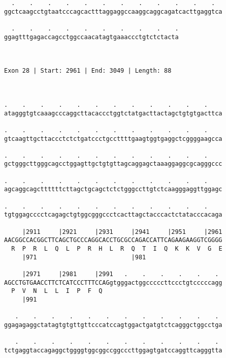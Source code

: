 \documentclass{article}
\begin{document}
\begin{Verbatim}
  .    .    .    .    .    .    .    .    .    .    .    .  
ggctcaagcctgtaatcccagcactttaggaggccaaggcaggcagatcacttgaggtca
                                                            
  .    .    .    .    .    .    .    .    .    .
ggagtttgagaccagcctggccaacatagtgaaaccctgtctctacta
                                                
                                                
 
Exon 28 | Start: 2961 | End: 3049 | Length: 88



.    .    .    .    .    .    .    .    .    .    .    .    
atagggtgtcaaagcccaggcttacaccctggtctatgacttactagctgtgtgacttca
                                                            
.    .    .    .    .    .    .    .    .    .    .    .    
gtcaagttgcttaccctctctgatccctgccttttgaagtggtgaggctcggggaagcca
                                                            
.    .    .    .    .    .    .    .    .    .    .    .    
gctgggcttgggcagcctggagttgctgtgttagcaggagctaaaggaggcgcagggccc
                                                            
.    .    .    .    .    .    .    .    .    .    .    .    
agcaggcagcttttttcttagctgcagctctctgggccttgtctcaagggaggttggagc
                                                            
.    .    .    .    .    .    .    .    .    .    .    .    
tgtggagcccctcagagctgtggcgggccctcacttagctacccactctatacccacaga
                                                            
     |2911     |2921     |2931     |2941     |2951     |2961
AACGGCCACGGCTTCAGCTGCCCAGGCACCTGCGCCAGACCATTCAGAAGAAGGTCGGGG
  R  P  R  L  Q  L  P  R  H  L  R  Q  T  I  Q  K  K  V  G  E
     |971                          |981                     
  
     |2971     |2981     |2991   .    .    .    .    .    . 
AGCCTGTGAACCTTCTCATCCCTTTCCAGgtgggactggcccccttccctgtcccccagg
  P  V  N  L  L  I  P  F  Q                                 
     |991                                                   
  
   .    .    .    .    .    .    .    .    .    .    .    . 
ggagagaggctatagtgtgttgttcccatccagtggactgatgtctcagggctggcctga
                                                            
   .    .    .    .    .    .    .    .    .    .    .    . 
tctgaggtaccagaggctggggtggcggccggcccttggagtgatccaggttcagggtta
                                                            

\end{Verbatim}
\end{document}
